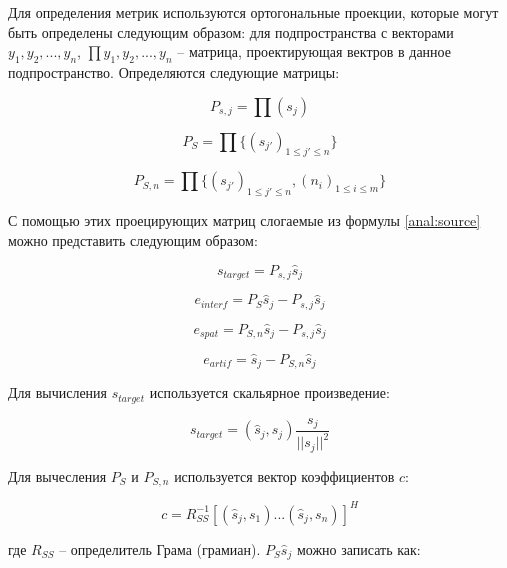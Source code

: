 Для определения метрик используются ортогональные проекции, которые могут быть определены следующим образом: для подпространства с векторами $y_1, y_2, ... , y_n$, $\prod{y_1, y_2, ... , y_n}$ -- матрица, проектирующая вектров в данное подпространство. Определяются следующие матрицы:

\begin{equation}
P_{s,j} = \prod(s_j)
\end{equation}

\begin{equation}
P_{S} = \prod\{(s_{j'})_{1\le j' \le n}\}
\end{equation}

\begin{equation}
P_{S, n} = \prod\{(s_{j'})_{1\le j' \le n}, (n_i)_{1 \le i \le m} \}
\end{equation}

С помощью этих проецирующих матриц слогаемые из формулы \ref{anal:source} можно представить следующим образом:

\begin{equation}
	s_{target} = P_{s,j} \hat{s}_j
\end{equation}

\begin{equation}
e_{interf} = P_{S} \hat{s}_j - P_{s,j} \hat{s}_j
\end{equation}

\begin{equation}
e_{spat} = P_{S, n} \hat{s}_j - P_{s,j} \hat{s}_j
\end{equation}

\begin{equation}
e_{artif} = \hat{s}_j - P_{S, n} \hat{s}_j
\end{equation}

Для вычисления $s_{target}$ используется скальярное произведение:

\begin{equation}
s_{target} = (\hat{s}_j, s_j) \frac{s_j}{|| s_j ||^2}
\end{equation}

Для вычесления $P_S$ и $P_{S,n}$ используется вектор коэффициентов $c$:

\begin{equation}
c = R_{SS}^{-1}[ (\hat{s}_j, s_1) ... (\hat{s}_j, s_n) ]^H
\end{equation}

где $R_{SS}$ -- определитель Грама (грамиан). $P_S \hat{s}_j$ можно записать как:

